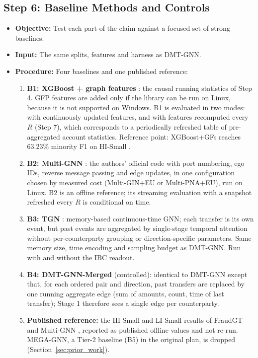 \documentclass[11pt,a4paper]{article}
\begin{document}
\subsection{Step 6: Baseline Methods and Controls}
\begin{itemize}[leftmargin=*]
    \item \textbf{Objective:} Test each part of the claim against a focused set of strong baselines.
    \item \textbf{Input:} The same splits, features and harness as DMT-GNN.
    \item \textbf{Procedure:} Four baselines and one published reference:
    \begin{enumerate}[leftmargin=*]
        \item \textbf{B1: XGBoost + graph features} \cite{chen2016xgboost}: the causal running statistics of Step 4. GFP features \cite{blanusa2024gfp} are added only if the library can be run on Linux, because it is not supported on Windows. B1 is evaluated in two modes: with continuously updated features, and with features recomputed every $R$ (Step 7), which corresponds to a periodically refreshed table of pre-aggregated account statistics. Reference point: XGBoost+GFs reaches 63.23\% minority F1 on HI-Small \cite{egressy2024multigraph}.
        \item \textbf{B2: Multi-GNN} \cite{egressy2024multigraph}: the authors' official code with port numbering, ego IDs, reverse message passing and edge updates, in one configuration chosen by measured cost (Multi-GIN+EU or Multi-PNA+EU), run on Linux. B2 is an offline reference; its streaming evaluation with a snapshot refreshed every $R$ is conditional on time.
        \item \textbf{B3: TGN} \cite{rossi2020tgn}: memory-based continuous-time GNN; each transfer is its own event, but past events are aggregated by single-stage temporal attention without per-counterparty grouping or direction-specific parameters. Same memory size, time encoding and sampling budget as DMT-GNN. Run with and without the IBC readout.
        \item \textbf{B4: DMT-GNN-Merged} (controlled): identical to DMT-GNN except that, for each ordered pair and direction, past transfers are replaced by one running aggregate edge (sum of amounts, count, time of last transfer); Stage 1 therefore sees a single edge per counterparty.
        \item \textbf{Published reference:} the HI-Small and LI-Small results of FraudGT \cite{lin2024fraudgt} and Multi-GNN \cite{egressy2024multigraph}, reported as published offline values and not re-run. MEGA-GNN, a Tier-2 baseline (B5) in the original plan, is dropped (Section~\ref{sec:prior_work}).

\end{enumerate}
\end{itemize}
\end{document}
